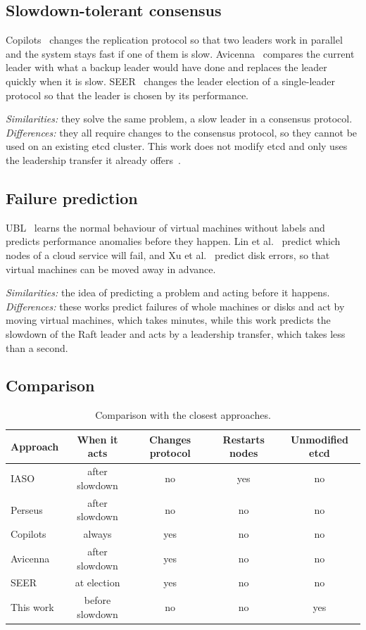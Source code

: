 \documentclass[11pt,a4paper]{article}
\begin{document}
\subsection{Slowdown-tolerant consensus}

Copilots~\cite{copilots} changes the replication protocol so that two leaders work in parallel and the system stays fast if one of them is slow. Avicenna~\cite{avicenna} compares the current leader with what a backup leader would have done and replaces the leader quickly when it is slow. SEER~\cite{seer} changes the leader election of a single-leader protocol so that the leader is chosen by its performance.

\emph{Similarities:} they solve the same problem, a slow leader in a consensus protocol. \emph{Differences:} they all require changes to the consensus protocol, so they cannot be used on an existing etcd cluster. This work does not modify etcd and only uses the leadership transfer it already offers~\cite{ongarothesis}.

\subsection{Failure prediction}

UBL~\cite{ubl} learns the normal behaviour of virtual machines without labels and predicts performance anomalies before they happen. Lin et al.~\cite{nodefailure} predict which nodes of a cloud service will fail, and Xu et al.~\cite{diskerror} predict disk errors, so that virtual machines can be moved away in advance.

\emph{Similarities:} the idea of predicting a problem and acting before it happens. \emph{Differences:} these works predict failures of whole machines or disks and act by moving virtual machines, which takes minutes, while this work predicts the slowdown of the Raft leader and acts by a leadership transfer, which takes less than a second.

\subsection{Comparison}

\begin{table}[H]
\centering
\small
\begin{tabular}{lcccc}
\toprule
Approach & When it acts & Changes protocol & Restarts nodes & Unmodified etcd \\
\midrule
IASO~\cite{iaso}         & after slowdown  & no  & yes & no  \\
Perseus~\cite{perseus}   & after slowdown  & no  & no  & no  \\
Copilots~\cite{copilots} & always          & yes & no  & no  \\
Avicenna~\cite{avicenna} & after slowdown  & yes & no  & no  \\
SEER~\cite{seer}         & at election     & yes & no  & no  \\
This work                & before slowdown & no  & no  & yes \\
\bottomrule
\end{tabular}
\caption{Comparison with the closest approaches.}
\end{table}
\end{document}

